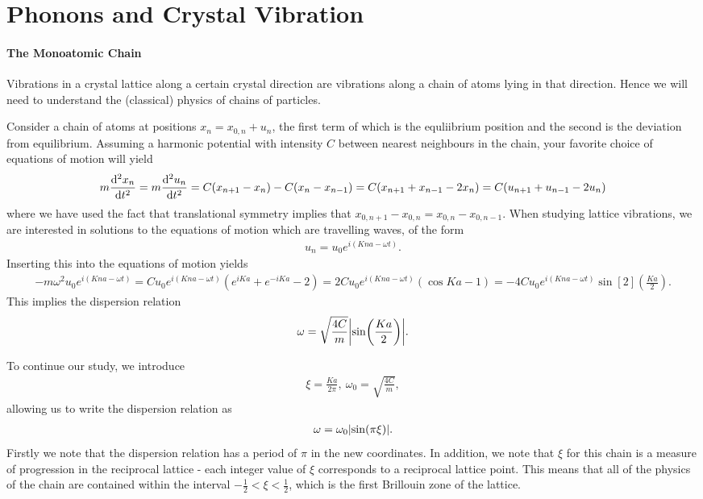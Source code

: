 \section{Phonons and Crystal Vibration}

\paragraph{The Monoatomic Chain}
Vibrations in a crystal lattice along a certain crystal direction are vibrations along a chain of atoms lying in that direction. Hence we will need to understand the (classical) physics of chains of particles.

Consider a chain of atoms at positions $x_{n} = x_{0,n} + u_{n}$, the first term of which is the equliibrium position and the second is the deviation from equilibrium. Assuming a harmonic potential with intensity $C$ between nearest neighbours in the chain, your favorite choice of equations of motion will yield
\begin{align*}
	m\dv[2]{x_{n}}{t} = m\dv[2]{u_{n}}{t} = C(x_{n + 1} - x_{n}) - C(x_{n} - x_{n - 1}) = C(x_{n + 1} + x_{n - 1} - 2x_{n}) = C(u_{n + 1} + u_{n - 1} - 2u_{n})
\end{align*}
where we have used the fact that translational symmetry implies that $x_{0,n + 1} - x_{0,n} = x_{0,n} - x_{0,n - 1}	$. When studying lattice vibrations, we are interested in solutions to the equations of motion which are travelling waves, of the form
\begin{align*}
	u_{n} = u_{0}e^{i(Kna - \omega t)}.
\end{align*}
Inserting this into the equations of motion yields
\begin{align*}
	-m\omega^{2}u_{0}e^{i(Kna - \omega t)} = Cu_{0}e^{i(Kna - \omega t)}\left(e^{iKa} + e^{-iKa} - 2\right) = 2Cu_{0}e^{i(Kna - \omega t)}\left(\cos{Ka} - 1\right) = -4Cu_{0}e^{i(Kna - \omega t)}\sin[2](\frac{Ka}{2}).
\end{align*}
This implies the dispersion relation
\begin{align*}
	\omega = \sqrt{\frac{4C}{m}}\abs{\sin(\frac{Ka}{2})}.
\end{align*}

To continue our study, we introduce
\begin{align*}
	\xi = \frac{Ka}{2\pi},\ \omega_{0} = \sqrt{\frac{4C}{m}},
\end{align*}
allowing us to write the dispersion relation as
\begin{align*}
	\omega = \omega_{0}\abs{\sin(\pi\xi)}.
\end{align*}
Firstly we note that the dispersion relation has a period of $\pi$ in the new coordinates. In addition, we note that $\xi$ for this chain is a measure of progression in the reciprocal lattice - each integer value of $\xi$ corresponds to a reciprocal lattice point. This means that all of the physics of the chain are contained within the interval $-\frac{1}{2} < \xi < \frac{1}{2}$, which is the first Brillouin zone of the lattice.

